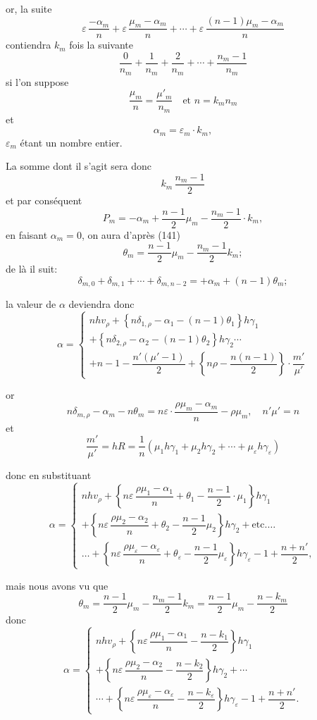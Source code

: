 \documentclass{article}
\begin{document}
or, la suite
\[ \varepsilon\,\frac{-\alpha_m}{n} + \varepsilon\,\frac{\mu_m-\alpha_m}{n} + \cdots + \varepsilon\,\frac{(n-1)\mu_m-\alpha_m}{n} \]
contiendra $k_m$ fois la suivante
\[ \frac{0}{n_m} + \frac{1}{n_m} + \frac{2}{n_m} + \cdots + \frac{n_m-1}{n_m} \]
si l'on suppose
\[ \frac{\mu_m}{n} = \frac{\mu'_m}{n_m} \quad \text{et } n = k_m n_m \]
et
\[ \alpha_m = \varepsilon_m \cdot k_m, \tag{170} \]
$\varepsilon_m$ étant un nombre entier.

La somme dont il s'agit sera donc
\[ k_m\,\frac{n_m-1}{2} \]
et par conséquent
\[ P_m = -\alpha_m + \frac{n-1}{2}\mu_m - \frac{n_m-1}{2} \cdot k_m, \]
en faisant $\alpha_m = 0$, on aura d'après (141)
\[ \theta_m = \frac{n-1}{2}\mu_m - \frac{n_m-1}{2}k_m; \]
de là il suit:
\[ \delta_{m,0}+\delta_{m,1}+\cdots+\delta_{m,n-2} = +\alpha_m+(n-1)\theta_m; \]

la valeur de $\alpha$ deviendra donc
\[ \alpha = \begin{cases}
nhv_\rho + \left\{n\delta_{1,\rho}-\alpha_1-(n-1)\theta_1\right\}h\gamma_1 \\
+ \left\{n\delta_{2,\rho}-\alpha_2-(n-1)\theta_2\right\}h\gamma_2 \cdots \\
+ n-1-\dfrac{n'(\mu'-1)}{2} + \left\{n\rho-\dfrac{n(n-1)}{2}\right\} \cdot \dfrac{m'}{\mu'}
\end{cases} \]

or
\[ n\delta_{m,\rho} - \alpha_m - n\theta_m = n\varepsilon \cdot \frac{\rho\mu_m-\alpha_m}{n} - \rho\mu_m, \quad n'\mu' = n \]
et
\[ \frac{m'}{\mu'} = hR = \frac{1}{n}\left(\mu_1 h\gamma_1+\mu_2 h\gamma_2+\cdots+\mu_\varepsilon h\gamma_\varepsilon\right) \]

donc en substituant
\[ \alpha = \begin{cases}
nhv_\rho + \left\{n\varepsilon\,\dfrac{\rho\mu_1-\alpha_1}{n}+\theta_1-\dfrac{n-1}{2} \cdot \mu_1\right\}h\gamma_1 \\
+ \left\{n\varepsilon\,\dfrac{\rho\mu_2-\alpha_2}{n}+\theta_2-\dfrac{n-1}{2}\mu_2\right\}h\gamma_2+\text{etc.}\ldots \\
\ldots + \left\{n\varepsilon\,\dfrac{\rho\mu_\varepsilon-\alpha_\varepsilon}{n}+\theta_\varepsilon-\dfrac{n-1}{2}\mu_\varepsilon\right\}h\gamma_\varepsilon-1+\dfrac{n+n'}{2},
\end{cases} \]

mais nous avons vu que
\[ \theta_m = \frac{n-1}{2}\mu_m - \frac{n_m-1}{2}k_m = \frac{n-1}{2}\mu_m - \frac{n-k_m}{2} \]
donc
\[ \alpha = \begin{cases}
nhv_\rho + \left\{n\varepsilon\,\dfrac{\rho\mu_1-\alpha_1}{n} - \dfrac{n-k_1}{2}\right\}h\gamma_1 \\
+ \left\{n\varepsilon\,\dfrac{\rho\mu_2-\alpha_2}{n} - \dfrac{n-k_2}{2}\right\}h\gamma_2+\cdots \\
\cdots+\left\{n\varepsilon\,\dfrac{\rho\mu_\varepsilon-\alpha_\varepsilon}{n}-\dfrac{n-k_\varepsilon}{2}\right\}h\gamma_\varepsilon-1+\dfrac{n+n'}{2}. \tag{171}
\end{cases} \]
\end{document}

